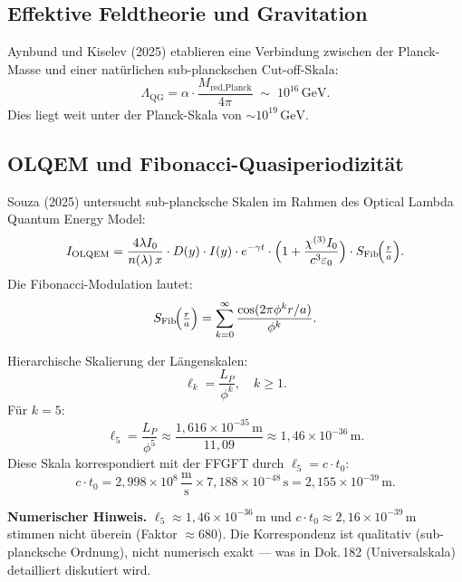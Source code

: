 \subsection{Effektive Feldtheorie und Gravitation}

Aynbund und Kiselev (2025) \cite{Aynbund2025} etablieren eine Verbindung
zwischen der Planck-Masse und einer natürlichen sub-planckschen Cut-off-Skala:
\begin{equation}
  \Lambda_{\text{QG}} = \alpha \cdot \frac{M_{\text{red,Planck}}}{4\pi}
  \;\sim\; 10^{16}\,\text{GeV}.
\end{equation}
Dies liegt weit unter der Planck-Skala von $\sim 10^{19}\,\text{GeV}$.

\subsection{OLQEM und Fibonacci-Quasiperiodizität}

Souza (2025) \cite{subPlanck2025} untersucht sub-plancksche Skalen im
Rahmen des Optical Lambda Quantum Energy Model:
\begin{equation}
  I_{\text{OLQEM}}
  = \frac{4\lambda I_0}{n(\lambda)\,x} \cdot D(y) \cdot I(y)
    \cdot e^{-\gamma t}
    \cdot \Bigl(1+\frac{\chi^{(3)}I_0}{c^3\varepsilon_0}\Bigr)
    \cdot S_{\text{Fib}}\!\Bigl(\tfrac{r}{a}\Bigr).
\end{equation}
Die Fibonacci-Modulation lautet:
\begin{equation}
  S_{\text{Fib}}\!\Bigl(\tfrac{r}{a}\Bigr)
  = \sum_{k=0}^{\infty} \frac{\cos(2\pi\phi^k r/a)}{\phi^k}.
\end{equation}

Hierarchische Skalierung der Längenskalen:
\begin{equation}
  \ell_k = \frac{L_P}{\phi^k},\quad k \ge 1.
\end{equation}
Für $k=5$:
\begin{equation}
  \ell_5 = \frac{L_P}{\phi^5}
         \approx \frac{1{,}616 \times 10^{-35}\,\text{m}}{11{,}09}
         \approx 1{,}46 \times 10^{-36}\,\text{m}.
\end{equation}
Diese Skala korrespondiert mit der FFGFT durch $\ell_5 = c\cdot t_0$:
\begin{equation}
  c \cdot t_0
  = 2{,}998 \times 10^8\,\frac{\text{m}}{\text{s}}
    \times 7{,}188 \times 10^{-48}\,\text{s}
  = 2{,}155 \times 10^{-39}\,\text{m}.
\end{equation}

\begin{warnbox}
\textbf{Numerischer Hinweis.}
$\ell_5 \approx 1{,}46 \times 10^{-36}\,\text{m}$ und
$c\cdot t_0 \approx 2{,}16 \times 10^{-39}\,\text{m}$
stimmen nicht überein (Faktor $\approx 680$).
Die Korrespondenz ist qualitativ (sub-plancksche Ordnung), nicht numerisch
exakt — was in Dok.\,182 (Universalskala) detailliert diskutiert wird.
\end{warnbox}

